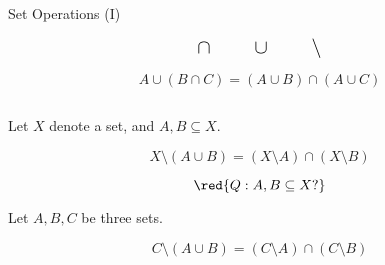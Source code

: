 
\begin{frame}{}
  \centerline{\Large Set Operations (I)}

  \[
    \text{\Large $\cap \qquad \cup \qquad \setminus$}
  \]
\end{frame}

\begin{frame}{}
\end{frame}

\begin{frame}{}
  \begin{theorem}
    \[
      A \cup (B \cap C) = (A \cup B) \cap (A \cup C)
    \]
  \end{theorem}

  \begin{columns}
      \pause
      \pause
  \end{columns}
\end{frame}

\begin{frame}{}
  \begin{theorem}
    Let $X$ denote a set, and $A, B \subseteq X$.

    \[
      X \setminus (A \cup B) = (X \setminus A) \cap (X \setminus B)
    \]
  \end{theorem}

  \pause
  \vspace{0.50cm}
  \[
    \red{Q: A, B \subseteq X?}
  \]

  \begin{theorem}
    Let $A, B, C$ be three sets.

    \[
      C \setminus (A \cup B) = (C \setminus A) \cap (C \setminus B)
    \]
  \end{theorem}
\end{frame}
